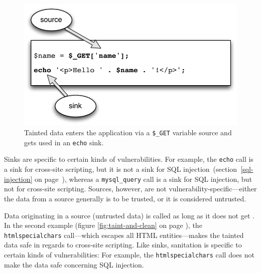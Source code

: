 \begin{figure}[htb]
  \begin{center}
    \includegraphics[scale=0.75]{images/taint}
    \caption{Tainted data enters the application via a \texttt{\$\_GET} variable source and gets used in an \texttt{echo} sink.}
    \label{fig:taint}
  \end{center}
\end{figure}

Sinks are specific to certain kinds of vulnerabilities. For example, the \texttt{echo} call is a sink for cross-site scripting, but it is not a sink for SQL injection~(section~\ref{sql-injection} on page~\pageref{sql-injection}), whereas a \texttt{mysql\_query} call is a sink for SQL injection, but not for cross-site scripting. Sources, however, are not vulnerability-specific---either the data from a source generally is to be trusted, or it is considered untrusted.

Data originating in a source (\ie untrusted data) is called  as long as it does not get . In the second example (figure \ref{fig:taint-and-clean} on page \pageref{fig:taint-and-clean}), the \texttt{htmlspecialchars} call---which escapes all HTML entities---makes the tainted data safe in regards to cross-site scripting. Like sinks, sanitation is specific to certain kinds of vulnerabilities: For example, the \texttt{htmlspecialchars} call does not make the data safe concerning SQL injection.

